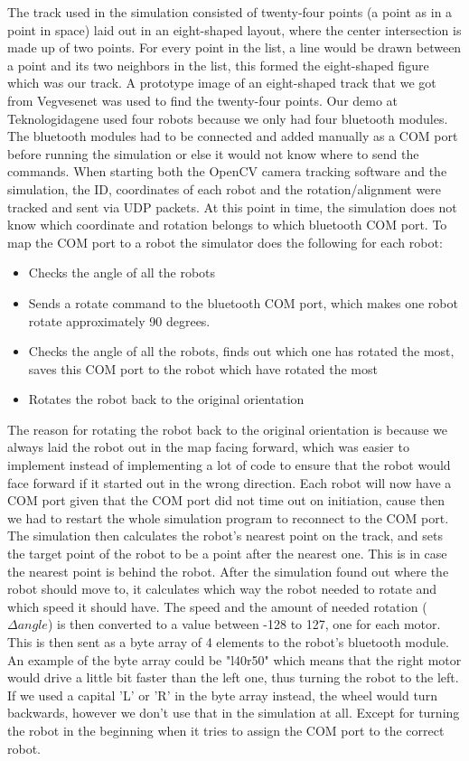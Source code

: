 The track used in the simulation consisted of twenty-four points (a point as in a point in space) laid out in an eight-shaped layout, where the center intersection is made up of two points. For every point in the list, a line would be drawn between a point and its two neighbors in the list, this formed the eight-shaped figure which was our track.
A prototype image of an eight-shaped track that we got from Vegvesenet was used to find the twenty-four points. 
Our demo at Teknologidagene used four robots because we only had four bluetooth modules. The bluetooth modules had to be connected and added manually as a COM port before running the simulation or else it would not know where to send the commands. When starting both the OpenCV camera tracking software and the simulation, the ID, coordinates of each robot and the rotation/alignment were tracked and sent via UDP packets. At this point in time, the simulation does not know which coordinate and rotation belongs to which bluetooth COM port. To map the COM port to a robot the simulator does the following for each robot:
\begin{itemize}
    \item Checks the angle of all the robots
    \item Sends a rotate command to the bluetooth COM port, which makes one robot rotate approximately 90 degrees.
    \item Checks the angle of all the robots, finds out which one has rotated the most, saves this COM port to the robot which have rotated the most
    \item Rotates the robot back to the original orientation
\end{itemize}
The reason for rotating the robot back to the original orientation is because we always laid the robot out in the map facing forward, which was easier to implement instead of implementing a lot of code to ensure that the robot would face forward if it started out in the wrong direction.
Each robot will now have a COM port given that the COM port did not time out on initiation, cause then we had to restart the whole simulation program to reconnect to the COM port.
The simulation then calculates the robot's nearest point on the track, and sets the target point of the robot to be a point after the nearest one. This is in case the nearest point is behind the robot. After the simulation found out where the robot should move to, it calculates which way the robot needed to rotate and which speed it should have. The speed and the amount of needed rotation ($\Delta angle$) is then converted to a value between -128 to 127, one for each motor. This is then sent as a byte array of 4 elements to the robot's bluetooth module. An example of the byte array could be "l40r50" which means that the right motor would drive a little bit faster than the left one, thus turning the robot to the left.
If we used a capital 'L' or 'R' in the byte array instead, the wheel would turn backwards, however we don't use that in the simulation at all. Except for turning the robot in the beginning when it tries to assign the COM port to the correct robot.

